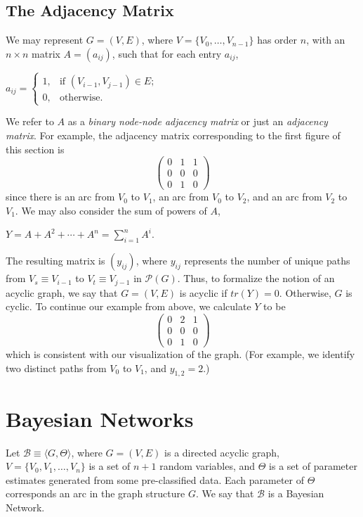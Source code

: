\documentclass[12pt,twoside]{reedthesis}
\begin{document}
	\subsection*{The Adjacency Matrix}
	We may represent $G=(V,E)$, where $V = \{V_0, \ldots, V_{n-1} \}$ has order $n$, with an $n \times n$ matrix $A = (a_{ij})$, such that for each entry $a_{ij}$, 
	\begin{center}
	 	$a_{ij} = 
		\begin{cases} 1, & \textrm{if\ \ \ } (V_{i-1},V_{j-1}) \in E; \\
		0, & \textrm{otherwise}. \end{cases}$
	 \end {center}
	We refer to $A$ as a {\em binary node-node adjacency matrix} or just an {\em adjacency matrix}. For example, the adjacency matrix corresponding to the first figure of this section is
	\[
	\begin{pmatrix}
	0 & 1 & 1 \\
	0 & 0 & 0 \\
	0 & 1 & 0
	\end{pmatrix} \]
	since there is an arc from $V_0$ to $V_1$, an arc from $V_0$ to $V_2$, and an arc from $V_2$ to $V_1$. We may also consider the sum of powers of $A$,
	\begin{center}
		$Y = A + A^2 + \cdots + A^n = \displaystyle\sum_{i=1}^{n} A^{i}$.
	\end{center}
	The resulting matrix is $(y_{ij})$, where $y_{ij}$ represents the number of unique paths from $V_s \equiv V_{i-1}$ to $V_t \equiv V_{j-1}$ in $\mathcal P(G)$. 
	Thus, to formalize the notion of an acyclic graph, we say that $G=(V,E)$ is acyclic if $tr(Y) = 0$. 
	Otherwise, $G$ is cyclic.
	To continue our example from above, we calculate $Y$ to be
	\[
	\begin{pmatrix}
	0 & 2 & 1 \\
	0 & 0 & 0 \\
	0 & 1 & 0
	\end{pmatrix} \]
	which is consistent with our visualization of the graph. 
	(For example, we identify two distinct paths from $V_0$ to $V_1$, and $y_{1,2} = 2$.)
	
	\section{Bayesian Networks}	
	Let $\mathcal{B} \equiv \langle G, \Theta \rangle$, where $G = (V,E)$ is a directed acyclic graph, $V = \{V_0, V_1, \ldots, V_n \}$ is a set of $n + 1$ random variables, and $\Theta$ is a set of parameter estimates generated from some pre-classified data. Each parameter of $\Theta$ corresponds an arc in the graph structure $G$. We say that $\mathcal{B}$ is a Bayesian Network.
\end{document}
